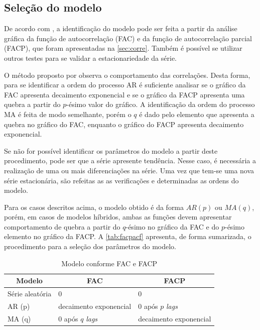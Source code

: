 \documentclass[
    12pt,
    oneside,
    a4paper,
    english,
    brazil
]{abntex2}
\begin{document}
\subsection{Seleção do modelo}

De acordo  com ,  a identificação  do modelo  pode ser  feita a
partir da  análise gráfica  da função  de autocorrelação (FAC)  e da  função de
autocorrelação parcial  (FACP), que foram apresentadas  na \autoref{sec:corre}.
Também é possível se utilizar outros  testes para se validar a estacionariedade
da série.

O método proposto por  observa o comportamento das correlações.
Desta forma, para  se identificar a ordem do processo  AR é suficiente analisar
se o  gráfico da FAC  apresenta decaimento exponencial e  se o gráfico  da FACP
apresenta uma quebra a partir do $p$-ésimo valor do gráfico. A identificação da
ordem  do processo  MA é  feita de  modo semelhante,  porém o  $q$ é  dado pelo
elemento que apresenta a  quebra no gráfico do FAC, enquanto  o gráfico do FACP
apresenta decaimento exponencial.

Se  não  for possível  identificar  os  parâmetros  do  modelo a  partir  deste
procedimento,  pode  ser  que  a  série  apresente  tendência.  Nesse  caso,  é
necessária a  realização de uma  ou mais diferenciações  na série. Uma  vez que
tem-se  uma  nova  série  estacionária,  são  refeitas  as  as  verificações  e
determinadas as ordens do modelo.


Para os casos descritos  acima, o modelo obtido é da  forma $AR(p)$ ou $MA(q)$,
porém,  em  casos  de  modelos  híbridos, ambas  as  funções  devem  apresentar
comportamento de quebra a partir do $q$-ésimo  no gráfico da FAC e do $p$-ésimo
elemento  no gráfico  da FACP\@.  A \autoref{tab:facpacf}  apresenta, de  forma
sumarizada, o procedimento para a seleção dos parâmetros do modelo.

\begin{table}[ht]
    \centering
    \caption{Modelo conforme FAC e FACP}\label{tab:facpacf}
    \begin{tabular}{l l l}
        \multicolumn{1}{c}{Modelo} & \multicolumn{1}{c}{FAC} & \multicolumn{1}{c}{FACP} \\
        \toprule
        Série aleatória  & 0                           & 0                        \\
        AR (p)           & decaimento exponencial      & 0 após $p$ \textit{lags} \\
        MA (q)           & 0 após $q$ \textit{lags}    & decaimento exponencial   \\
    \end{tabular}
\end{table}
\end{document}
